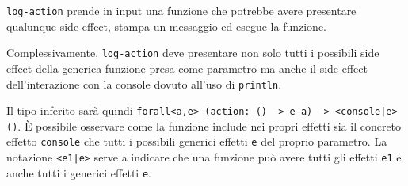 \lstinline{log-action} prende in input una funzione che potrebbe avere presentare qualunque side effect, stampa un messaggio ed esegue la funzione.

Complessivamente, \lstinline{log-action} deve presentare non solo tutti i possibili side effect della generica funzione presa come parametro ma anche il side effect dell'interazione con la console dovuto all'uso di \lstinline{println}.

Il tipo inferito sarà quindi \lstinline{forall<a,e> (action: () -> e a) -> <console|e> ()}. È possibile osservare come la funzione include nei propri effetti sia il concreto effetto \lstinline{console} che tutti i possibili generici effetti \lstinline{e} del proprio parametro.
La notazione \lstinline{<e1|e>} serve a indicare che una funzione può avere tutti gli effetti \lstinline{e1} e anche tutti i generici effetti \lstinline{e}.
